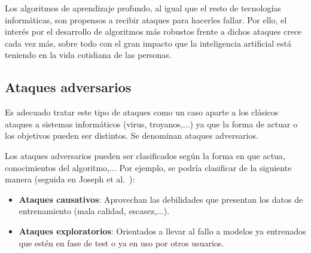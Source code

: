 Los algoritmos de aprendizaje profundo, al igual que el resto de tecnologías informáticas, son propensos a recibir ataques para hacerles fallar. Por ello, el interés por el desarrollo de algoritmos más robustos frente a dichos ataques crece cada vez más, sobre todo con el gran impacto que la inteligencia artificial está teniendo en la vida cotidiana de las personas.

\subsection{Ataques adversarios}

Es adecuado tratar este tipo de ataques como un caso aparte a los clásicos ataques a sistemas informáticos (virus, troyanos,...) ya que la forma de actuar o los objetivos pueden ser distintos. Se denominan ataques adversarios.

Los ataques adversarios pueden ser clasificados según la forma en que actua, conocimientos del algoritmo,... Por ejemplo, se podría clasificar de la siguiente manera (seguida en Joseph et al.~\cite{LibroAdvMachL}):
\begin{itemize}
	\item \textbf{Ataques causativos}: Aprovechan las debilidades que presentan los datos de entrenamiento (mala calidad, escasez,...).
	\item \textbf{Ataques exploratorios}: Orientados a llevar al fallo a modelos ya entrenados que estén en fase de test o ya en uso por otros usuarios.
\end{itemize}

